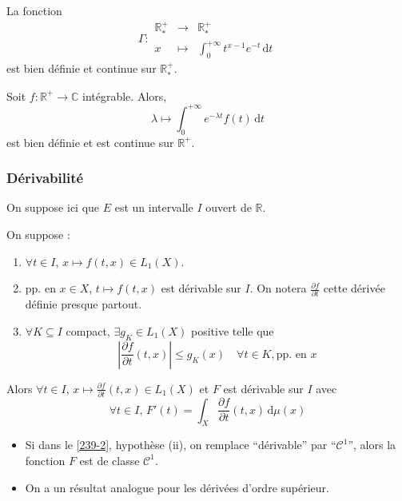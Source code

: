
  \begin{example}
    \label{239-1}
    La fonction
    \[ \Gamma :
    \begin{array}{ccc}
      \mathbb{R}^+_* &\rightarrow& \mathbb{R}^+_* \\
      x &\mapsto& \int_{0}^{+\infty} t^{x-1} e^{-t} \, \mathrm{d}t
    \end{array}
    \]
    est bien définie et continue sur $\mathbb{R}^+_*$.
  \end{example}


  \begin{example}
    Soit $f : \mathbb{R}^+ \rightarrow \mathbb{C}$ intégrable. Alors,
    \[ \lambda \mapsto \int_0^{+\infty} e^{-\lambda t} f(t) \, \mathrm{d}t \]
    est bien définie et est continue sur $\mathbb{R}^+$.
  \end{example}

  \subsubsection{Dérivabilité}


  On suppose ici que $E$ est un intervalle $I$ ouvert de $\mathbb{R}$.

  \begin{theorem}
    \label{239-2}
    On suppose :
    \begin{enumerate}[label={\bfseries(\roman*)}]
      \item $\forall t \in I$, $x \mapsto f(t,x) \in L_1(X)$.
      \item pp. en $x \in X$, $t \mapsto f(t,x)$ est dérivable sur $I$. On notera $\frac{\partial f}{\partial t}$ cette dérivée définie presque partout.
      \item $\forall K \subseteq I$ compact, $\exists g_K \in L_1(X)$ positive telle que
      \[ \left| \frac{\partial f}{\partial t}(t,x) \right| \leq g_K(x) \quad \forall t \in K, \text{pp. en } x \]
    \end{enumerate}
    Alors $\forall t \in I$, $x \mapsto \frac{\partial f}{\partial t}(t, x) \in L_1(X)$ et $F$ est dérivable sur $I$ avec
    \[ \forall t \in I, \, F'(t) = \int_X \frac{\partial f}{\partial t}(t, x) \, \mathrm{d}\mu(x) \]
  \end{theorem}

  \begin{remark}
    \begin{itemize}
      \item Si dans le \cref{239-2}, hypothèse (ii), on remplace ``dérivable'' par ``$\mathcal{C}^1$'', alors la fonction $F$ est de classe $\mathcal{C}^1$.
      \item On a un résultat analogue pour les dérivées d'ordre supérieur.
    \end{itemize}
  \end{remark}


